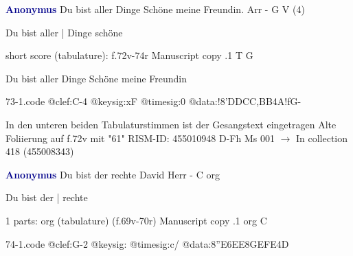 \documentclass[twocolumn]{book}
\begin{document}
\newline \par \vspace{7pt} \textcolor{darkblue}{\textbf{Anonymus  }}
\newline Du bist aller Dinge Schöne meine Freundin. Arr - G
\newline V (4)
\newline \begin{itshape}[f.72v, at left:] Du bist aller | Dinge schöne\end{itshape} 
\newline \textcolor{darkblue}{}  short score (tabulature): f.72v-74r
\newline Manuscript copy
.1  T  G
\newline \begin{footnotesize} Du bist aller Dinge Schöne meine Freundin \end{footnotesize}  
\begin{filecontents*}{73-1.code}
@clef:C-4
@keysig:xF
@timesig:0
@data:!{8'DDCC}{,BB}4A!fG-
\end{filecontents*}
\newline
%

\newline In den unteren beiden Tabulaturstimmen ist der Gesangstext eingetragen
\newline Alte Foliierung auf f.72v mit "61"
\newline RISM-ID: 455010948
\newline D-Fh  Ms 001
\newline $\rightarrow$ In collection 418 (455008343)
      
\newline \par \vspace{7pt} \textcolor{darkblue}{\textbf{Anonymus  }}
\newline Du bist der rechte David Herr - C
\newline org
\newline \begin{itshape}[f.69v, at left:] Du bist der | rechte\end{itshape} 
\newline \textcolor{darkblue}{}  1 parts: org (tabulature)  (f.69v-70r)
\newline Manuscript copy
.1  org  C  
\begin{filecontents*}{74-1.code}
@clef:G-2
@keysig:
@timesig:c/
@data:{8''E6EE8GE}{FE}4D
\end{filecontents*}
\newline
%
\end{document}
